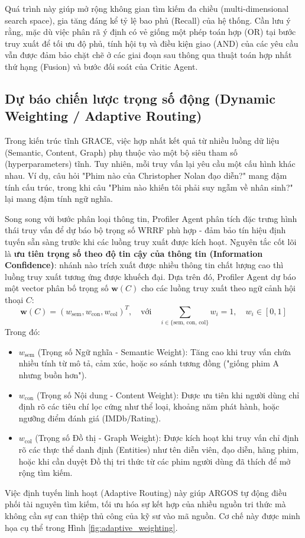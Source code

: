 Quá trình này giúp mở rộng không gian tìm kiếm đa chiều (multi-dimensional search space), gia tăng đáng kể tỷ lệ bao phủ (Recall) của hệ thống. Cần lưu ý rằng, mặc dù việc phân rã ý định có vẻ giống một phép toán hợp (OR) tại bước truy xuất để tối ưu độ phủ, tính hội tụ và điều kiện giao (AND) của các yêu cầu vẫn được đảm bảo chặt chẽ ở các giai đoạn sau thông qua thuật toán hợp nhất thứ hạng (Fusion) và bước đối soát của Critic Agent.

\subsection{Dự báo chiến lược trọng số động (Dynamic Weighting / Adaptive Routing)}
Trong kiến trúc tĩnh GRACE, việc hợp nhất kết quả từ nhiều luồng dữ liệu (Semantic, Content, Graph) phụ thuộc vào một bộ siêu tham số (hyperparameters) tĩnh. Tuy nhiên, mỗi truy vấn lại yêu cầu một cấu hình khác nhau. Ví dụ, câu hỏi "Phim nào của Christopher Nolan đạo diễn?" mang đậm tính cấu trúc, trong khi câu "Phim nào khiến tôi phải suy ngẫm về nhân sinh?" lại mang đậm tính ngữ nghĩa.

Song song với bước phân loại thông tin, Profiler Agent phân tích đặc trưng hình thái truy vấn để dự báo bộ trọng số WRRF phù hợp - đảm bảo tín hiệu định tuyến sẵn sàng trước khi các luồng truy xuất được kích hoạt. Nguyên tắc cốt lõi là \textbf{ưu tiên trọng số theo độ tin cậy của thông tin (Information Confidence)}: nhánh nào trích xuất được nhiều thông tin chất lượng cao thì luồng truy xuất tương ứng được khuếch đại. Dựa trên đó, Profiler Agent dự báo một vector phân bố trọng số $\mathbf{w}(C)$ cho các luồng truy xuất theo ngữ cảnh hội thoại $C$:
\begin{equation}
    \mathbf{w}(C) = (w_{\text{sem}}, w_{\text{con}}, w_{\text{col}})^T, \quad \text{với} \quad \sum_{i \in \{\text{sem, con, col}\}} w_i = 1, \quad w_i \in [0, 1]
\end{equation}
Trong đó:
\begin{itemize}
    \item $w_{\text{sem}}$ (Trọng số Ngữ nghĩa - Semantic Weight): Tăng cao khi truy vấn chứa nhiều tính từ mô tả, cảm xúc, hoặc so sánh tương đồng ("giống phim A nhưng buồn hơn").
    \item $w_{\text{con}}$ (Trọng số Nội dung - Content Weight): Được ưu tiên khi người dùng chỉ định rõ các tiêu chí lọc cứng như thể loại, khoảng năm phát hành, hoặc ngưỡng điểm đánh giá (IMDb/Rating).
    \item $w_{\text{col}}$ (Trọng số Đồ thị - Graph Weight): Được kích hoạt khi truy vấn chỉ định rõ các thực thể danh định (Entities) như tên diễn viên, đạo diễn, hãng phim, hoặc khi cần duyệt Đồ thị tri thức từ các phim người dùng đã thích để mở rộng tìm kiếm.
\end{itemize}
Việc định tuyến linh hoạt (Adaptive Routing) này giúp ARGOS tự động điều phối tài nguyên tìm kiếm, tối ưu hóa sự kết hợp của nhiều nguồn tri thức mà không cần sự can thiệp thủ công của kỹ sư vào mã nguồn. Cơ chế này được minh họa cụ thể trong Hình \ref{fig:adaptive_weighting}.

